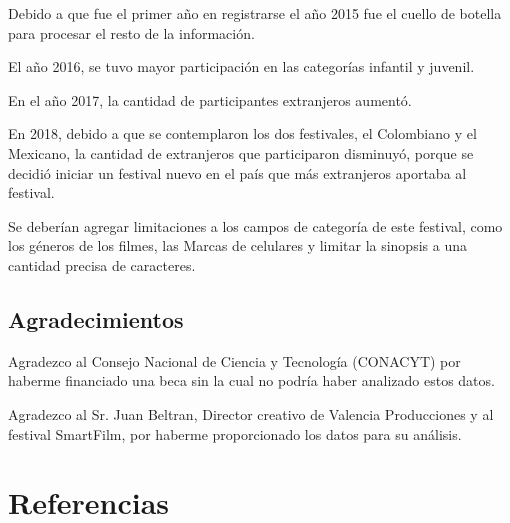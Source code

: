 \documentclass[5p,times]{elsarticle}
\begin{document}
Debido a que fue el primer año en registrarse el año 2015 fue el cuello de botella para procesar el resto de la información.

El año 2016, se tuvo mayor participación en las categorías infantil y juvenil.

En el año 2017, la cantidad de participantes extranjeros aumentó.

En 2018, debido a que se contemplaron los dos festivales, el Colombiano y el Mexicano, la cantidad de extranjeros que participaron disminuyó, porque se decidió iniciar un festival nuevo en el país que más extranjeros aportaba al festival.

Se deberían agregar limitaciones a los campos de categoría de este festival, como los géneros de los filmes, las Marcas de celulares y limitar la sinopsis a una cantidad precisa de caracteres. 




\subsection*{Agradecimientos}
Agradezco al Consejo Nacional de Ciencia y Tecnología (CONACYT) por haberme financiado una beca sin la cual no podría haber analizado estos datos.

Agradezco al Sr. Juan Beltran, Director creativo de Valencia Producciones y al festival SmartFilm, por haberme proporcionado los datos para su análisis.

\section*{Referencias}



\end{document}

